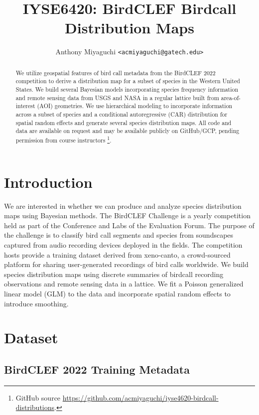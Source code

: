 \documentclass[notitlepage]{article}
\title{IYSE6420: BirdCLEF Birdcall Distribution Maps}
\author{
    Anthony Miyaguchi \texttt{<acmiyaguchi@gatech.edu>}
}
\begin{document}
\maketitle
\thispagestyle{empty}

\begin{abstract}

We utilize geospatial features of bird call metadata from the BirdCLEF 2022 competition to derive a distribution map for a subset of species in the Western United States.
We build several Bayesian models incorporating species frequency information and remote sensing data from USGS and NASA in a regular lattice built from area-of-interest (AOI) geometries. 
We use hierarchical modeling to incorporate information across a subset of species and a conditional autoregressive (CAR) distribution for spatial random effects and generate several species distribution maps.
All code and data are available on request and may be available publicly on GitHub/GCP, pending permission from course instructors \footnote{GitHub source \url{https://github.com/acmiyaguchi/iyse4620-birdcall-distributions}.}.

\end{abstract}


\section{Introduction}

We are interested in whether we can produce and analyze species distribution maps using Bayesian methods.
The BirdCLEF Challenge is a yearly competition held as part of the Conference and Labs of the Evaluation Forum.
The purpose of the challenge is to classify bird call segments and species from soundscapes captured from audio recording devices deployed in the fields.
The competition hosts provide a training dataset derived from xeno-canto, a crowd-sourced platform for sharing user-generated recordings of bird calls worldwide.
We build species distribution maps using discrete summaries of birdcall recording observations and remote sensing data in a lattice.
We fit a Poisson generalized linear model (GLM) to the data and incorporate spatial random effects to introduce smoothing.

\section{Dataset}
\subsection{BirdCLEF 2022 Training Metadata}
\end{document}
